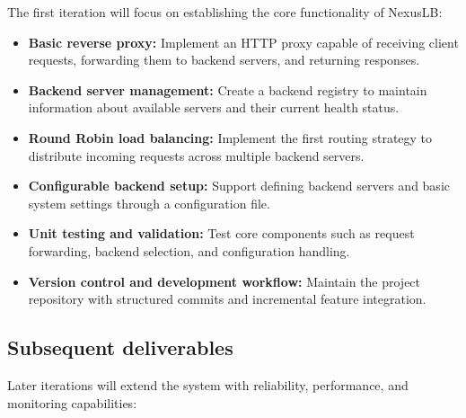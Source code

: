 \documentclass[11pt,a4paper]{article}
\begin{document}
The first iteration will focus on establishing the core functionality of NexusLB:

\begin{itemize}
    \item \textbf{Basic reverse proxy:} Implement an HTTP proxy capable of receiving client requests, forwarding them to backend servers, and returning responses.

    \item \textbf{Backend server management:} Create a backend registry to maintain information about available servers and their current health status.

    \item \textbf{Round Robin load balancing:} Implement the first routing strategy to distribute incoming requests across multiple backend servers.

    \item \textbf{Configurable backend setup:} Support defining backend servers and basic system settings through a configuration file.

    \item \textbf{Unit testing and validation:} Test core components such as request forwarding, backend selection, and configuration handling.

    \item \textbf{Version control and development workflow:} Maintain the project repository with structured commits and incremental feature integration.
\end{itemize}


\subsection{Subsequent deliverables}

Later iterations will extend the system with reliability, performance, and monitoring capabilities:
\end{document}
